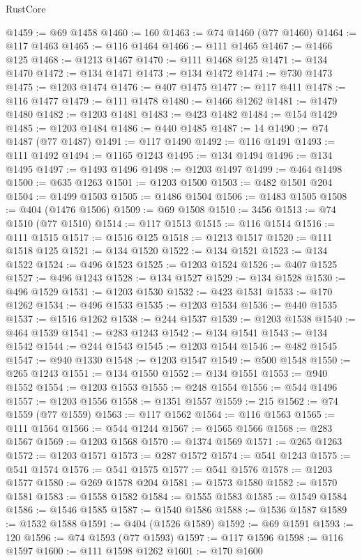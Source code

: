 \begin{lexlean}{RustCore}
\begin{coremodule}
@1459 := @69 @1458
@1460 := 160
@1463 := @74 @1460 (@77 @1460)
@1464 := @117 @1463
@1465 := @116 @1464
@1466 := @111 @1465
@1467 := @1466 @125
@1468 := @1213 @1467
@1470 := @111 @1468 @125
@1471 := @134 @1470
@1472 := @134 @1471
@1473 := @134 @1472
@1474 := @730 @1473
@1475 := @1203 @1474
@1476 := @407 @1475
@1477 := @117 @411
@1478 := @116 @1477
@1479 := @111 @1478
@1480 := @1466 @1262
@1481 := @1479 @1480
@1482 := @1203 @1481
@1483 := @423 @1482
@1484 := @154 @1429
@1485 := @1203 @1484
@1486 := @440 @1485
@1487 := 14
@1490 := @74 @1487 (@77 @1487)
@1491 := @117 @1490
@1492 := @116 @1491
@1493 := @111 @1492
@1494 := @1165 @1243
@1495 := @134 @1494
@1496 := @134 @1495
@1497 := @1493 @1496
@1498 := @1203 @1497
@1499 := @464 @1498
@1500 := @635 @1263
@1501 := @1203 @1500
@1503 := @482 @1501 @204
@1504 := @1499 @1503
@1505 := @1486 @1504
@1506 := @1483 @1505
@1508 := @404 (@1476 @1506)
@1509 := @69 @1508
@1510 := 3456
@1513 := @74 @1510 (@77 @1510)
@1514 := @117 @1513
@1515 := @116 @1514
@1516 := @111 @1515
@1517 := @1516 @125
@1518 := @1213 @1517
@1520 := @111 @1518 @125
@1521 := @134 @1520
@1522 := @134 @1521
@1523 := @134 @1522
@1524 := @496 @1523
@1525 := @1203 @1524
@1526 := @407 @1525
@1527 := @496 @1243
@1528 := @134 @1527
@1529 := @134 @1528
@1530 := @496 @1529
@1531 := @1203 @1530
@1532 := @423 @1531
@1533 := @170 @1262
@1534 := @496 @1533
@1535 := @1203 @1534
@1536 := @440 @1535
@1537 := @1516 @1262
@1538 := @244 @1537
@1539 := @1203 @1538
@1540 := @464 @1539
@1541 := @283 @1243
@1542 := @134 @1541
@1543 := @134 @1542
@1544 := @244 @1543
@1545 := @1203 @1544
@1546 := @482 @1545
@1547 := @940 @1330
@1548 := @1203 @1547
@1549 := @500 @1548
@1550 := @265 @1243
@1551 := @134 @1550
@1552 := @134 @1551
@1553 := @940 @1552
@1554 := @1203 @1553
@1555 := @248 @1554
@1556 := @544 @1496
@1557 := @1203 @1556
@1558 := @1351 @1557
@1559 := 215
@1562 := @74 @1559 (@77 @1559)
@1563 := @117 @1562
@1564 := @116 @1563
@1565 := @111 @1564
@1566 := @544 @1244
@1567 := @1565 @1566
@1568 := @283 @1567
@1569 := @1203 @1568
@1570 := @1374 @1569
@1571 := @265 @1263
@1572 := @1203 @1571
@1573 := @287 @1572
@1574 := @541 @1243
@1575 := @541 @1574
@1576 := @541 @1575
@1577 := @541 @1576
@1578 := @1203 @1577
@1580 := @269 @1578 @204
@1581 := @1573 @1580
@1582 := @1570 @1581
@1583 := @1558 @1582
@1584 := @1555 @1583
@1585 := @1549 @1584
@1586 := @1546 @1585
@1587 := @1540 @1586
@1588 := @1536 @1587
@1589 := @1532 @1588
@1591 := @404 (@1526 @1589)
@1592 := @69 @1591
@1593 := 120
@1596 := @74 @1593 (@77 @1593)
@1597 := @117 @1596
@1598 := @116 @1597
@1600 := @111 @1598 @1262
@1601 := @170 @1600

\end{coremodule}
\end{lexlean}
